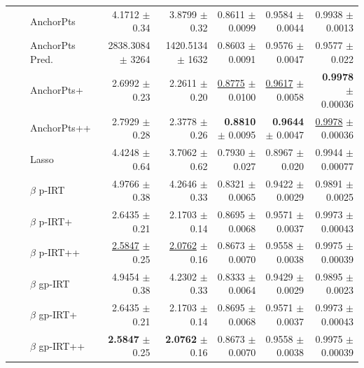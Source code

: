 \begin{longtable}{llp{}rrrrr}
 &  & AnchorPts & 4.1712 {\scriptsize $\pm$ 0.34} & 3.8799 {\scriptsize $\pm$ 0.32} & 0.8611 {\scriptsize $\pm$ 0.0099} & 0.9584 {\scriptsize $\pm$ 0.0044} & 0.9938 {\scriptsize $\pm$ 0.0013} \\
 &  & AnchorPts Pred. & 2838.3084 {\scriptsize $\pm$ 3264} & 1420.5134 {\scriptsize $\pm$ 1632} & 0.8603 {\scriptsize $\pm$ 0.0091} & 0.9576 {\scriptsize $\pm$ 0.0047} & 0.9577 {\scriptsize $\pm$ 0.022} \\
 &  & AnchorPts+ & 2.6992 {\scriptsize $\pm$ 0.23} & 2.2611 {\scriptsize $\pm$ 0.20} & \underline{0.8775} {\scriptsize $\pm$ 0.0100} & \underline{0.9617} {\scriptsize $\pm$ 0.0058} & \textbf{0.9978} {\scriptsize $\pm$ 0.00036} \\
 &  & AnchorPts++ & 2.7929 {\scriptsize $\pm$ 0.28} & 2.3778 {\scriptsize $\pm$ 0.26} & \textbf{0.8810} {\scriptsize $\pm$ 0.0095} & \textbf{0.9644} {\scriptsize $\pm$ 0.0047} & \underline{0.9978} {\scriptsize $\pm$ 0.00036} \\
 &  & Lasso & 4.4248 {\scriptsize $\pm$ 0.64} & 3.7062 {\scriptsize $\pm$ 0.62} & 0.7930 {\scriptsize $\pm$ 0.027} & 0.8967 {\scriptsize $\pm$ 0.020} & 0.9944 {\scriptsize $\pm$ 0.00077} \\
 &  & $\beta$ p-IRT & 4.9766 {\scriptsize $\pm$ 0.38} & 4.2646 {\scriptsize $\pm$ 0.33} & 0.8321 {\scriptsize $\pm$ 0.0065} & 0.9422 {\scriptsize $\pm$ 0.0029} & 0.9891 {\scriptsize $\pm$ 0.0025} \\
 &  & $\beta$ p-IRT+ & 2.6435 {\scriptsize $\pm$ 0.21} & 2.1703 {\scriptsize $\pm$ 0.14} & 0.8695 {\scriptsize $\pm$ 0.0068} & 0.9571 {\scriptsize $\pm$ 0.0037} & 0.9973 {\scriptsize $\pm$ 0.00043} \\
 &  & $\beta$ p-IRT++ & \underline{2.5847} {\scriptsize $\pm$ 0.25} & \underline{2.0762} {\scriptsize $\pm$ 0.16} & 0.8673 {\scriptsize $\pm$ 0.0070} & 0.9558 {\scriptsize $\pm$ 0.0038} & 0.9975 {\scriptsize $\pm$ 0.00039} \\
 &  & $\beta$ gp-IRT & 4.9454 {\scriptsize $\pm$ 0.38} & 4.2302 {\scriptsize $\pm$ 0.33} & 0.8333 {\scriptsize $\pm$ 0.0064} & 0.9429 {\scriptsize $\pm$ 0.0029} & 0.9895 {\scriptsize $\pm$ 0.0023} \\
 &  & $\beta$ gp-IRT+ & 2.6435 {\scriptsize $\pm$ 0.21} & 2.1703 {\scriptsize $\pm$ 0.14} & 0.8695 {\scriptsize $\pm$ 0.0068} & 0.9571 {\scriptsize $\pm$ 0.0037} & 0.9973 {\scriptsize $\pm$ 0.00043} \\
 &  & $\beta$ gp-IRT++ & \textbf{2.5847} {\scriptsize $\pm$ 0.25} & \textbf{2.0762} {\scriptsize $\pm$ 0.16} & 0.8673 {\scriptsize $\pm$ 0.0070} & 0.9558 {\scriptsize $\pm$ 0.0038} & 0.9975 {\scriptsize $\pm$ 0.00039} \\

\end{longtable}
